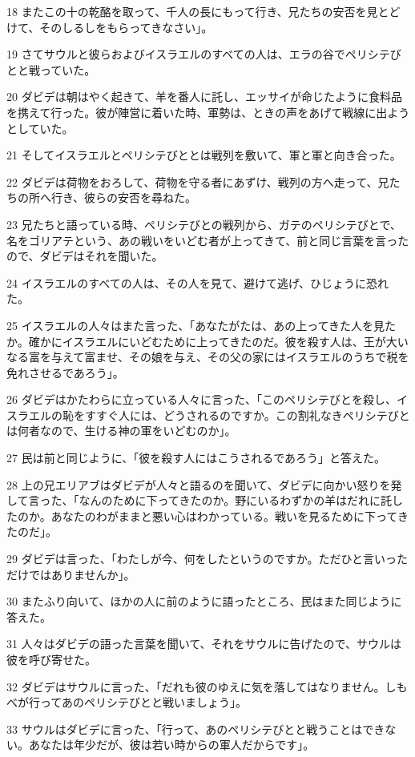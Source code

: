 \par 18 またこの十の乾酪を取って、千人の長にもって行き、兄たちの安否を見とどけて、そのしるしをもらってきなさい」。
\par 19 さてサウルと彼らおよびイスラエルのすべての人は、エラの谷でペリシテびとと戦っていた。
\par 20 ダビデは朝はやく起きて、羊を番人に託し、エッサイが命じたように食料品を携えて行った。彼が陣営に着いた時、軍勢は、ときの声をあげて戦線に出ようとしていた。
\par 21 そしてイスラエルとペリシテびととは戦列を敷いて、軍と軍と向き合った。
\par 22 ダビデは荷物をおろして、荷物を守る者にあずけ、戦列の方へ走って、兄たちの所へ行き、彼らの安否を尋ねた。
\par 23 兄たちと語っている時、ペリシテびとの戦列から、ガテのペリシテびとで、名をゴリアテという、あの戦いをいどむ者が上ってきて、前と同じ言葉を言ったので、ダビデはそれを聞いた。
\par 24 イスラエルのすべての人は、その人を見て、避けて逃げ、ひじょうに恐れた。
\par 25 イスラエルの人々はまた言った、「あなたがたは、あの上ってきた人を見たか。確かにイスラエルにいどむために上ってきたのだ。彼を殺す人は、王が大いなる富を与えて富ませ、その娘を与え、その父の家にはイスラエルのうちで税を免れさせるであろう」。
\par 26 ダビデはかたわらに立っている人々に言った、「このペリシテびとを殺し、イスラエルの恥をすすぐ人には、どうされるのですか。この割礼なきペリシテびとは何者なので、生ける神の軍をいどむのか」。
\par 27 民は前と同じように、「彼を殺す人にはこうされるであろう」と答えた。
\par 28 上の兄エリアブはダビデが人々と語るのを聞いて、ダビデに向かい怒りを発して言った、「なんのために下ってきたのか。野にいるわずかの羊はだれに託したのか。あなたのわがままと悪い心はわかっている。戦いを見るために下ってきたのだ」。
\par 29 ダビデは言った、「わたしが今、何をしたというのですか。ただひと言いっただけではありませんか」。
\par 30 またふり向いて、ほかの人に前のように語ったところ、民はまた同じように答えた。
\par 31 人々はダビデの語った言葉を聞いて、それをサウルに告げたので、サウルは彼を呼び寄せた。
\par 32 ダビデはサウルに言った、「だれも彼のゆえに気を落してはなりません。しもべが行ってあのペリシテびとと戦いましょう」。
\par 33 サウルはダビデに言った、「行って、あのペリシテびとと戦うことはできない。あなたは年少だが、彼は若い時からの軍人だからです」。
